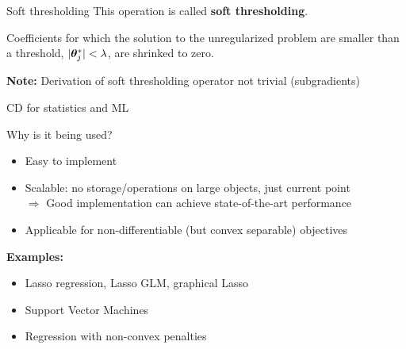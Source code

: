 \documentclass[11pt,compress,t,notes=noshow, xcolor=table]{beamer}
\begin{document}
\begin{vbframe}{Soft thresholding}
This operation is called \textbf{soft thresholding}.

\medskip

Coefficients for which the solution to the unregularized problem are smaller than a threshold, $|\bm{\theta}^\ast_j| < \lambda$, are shrinked to zero. 

\medskip


\textbf{Note:} Derivation of soft thresholding operator not trivial (subgradients)

\end{vbframe}


\begin{vbframe}{CD for statistics and ML}

Why is it being used?

\begin{itemize}
\item Easy to implement
\item Scalable: no storage/operations on large objects,
  just current point \\
    $\Rightarrow$ Good implementation can achieve state-of-the-art performance
\item Applicable for non-differentiable (but convex separable) objectives
\end{itemize}

\medskip

\textbf{Examples:}
\begin{itemize}
\item Lasso regression, Lasso GLM, graphical Lasso
\item Support Vector Machines
\item Regression with non-convex penalties
\end{itemize}




\end{vbframe}


\endlecture
\end{document}

